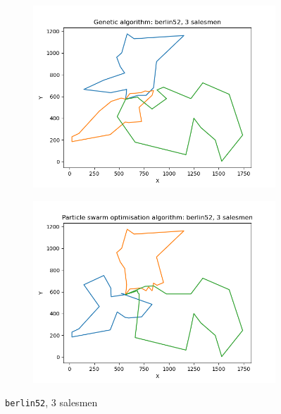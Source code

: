 \documentclass[conference]{IEEEtran}
\begin{document}
\begin{figure}[h]
    \centering
    \begin{subfigure}{.5\textwidth}
      \centering
      \includegraphics[width=\textwidth]{images/Genetic algorithm: berlin52, 3 salesmen.png}
    \end{subfigure}%
    \begin{subfigure}{.5\textwidth}
      \centering
      \includegraphics[width=\textwidth]{images/Particle swarm optimisation algorithm: berlin52, 3 salesmen.png}
    \end{subfigure}%
    \caption{\texttt{berlin52}, 3 salesmen} \label{berlin52, 3 salesmen}
\end{figure}
\end{document}
